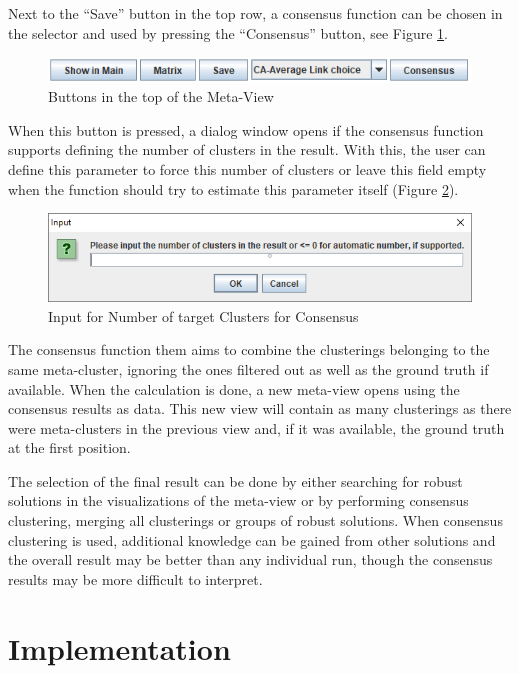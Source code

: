 \documentclass[
	a4paper,
	english,
	twoside,
	openright,               
	11pt                            
	]{report}
\begin{document}
Next to the ``Save'' button in the top row, a consensus function can be chosen in the selector and used by pressing the ``Consensus'' button, see Figure \ref{fig:cons_button}. 

\begin{figure}[h]
	\centering
	\includegraphics[scale=.75]{cons_button}
	\caption{Buttons in the top of the Meta-View}
	\label{fig:cons_button}
\end{figure}

When this button is pressed, a dialog window opens if the consensus function supports defining the number of clusters in the result. With this, the user can define this parameter to force this number of clusters or leave this field empty when the function should try to estimate this parameter itself (Figure \ref{fig:choosek_window}).

\begin{figure}[h]
	\centering
	\includegraphics[scale=.6]{choosek_window}
	\caption{Input for Number of target Clusters for Consensus}
	\label{fig:choosek_window}
\end{figure}

The consensus function them aims to combine the clusterings belonging to the same meta-cluster, ignoring the ones filtered out as well as the ground truth if available. When the calculation is done, a new meta-view opens using the consensus results as data. This new view will contain as many clusterings as there were meta-clusters in the previous view and, if it was available, the ground truth at the first position.

The selection of the final result can be done by either searching for robust solutions in the visualizations of the meta-view or by performing consensus clustering, merging all clusterings or groups of robust solutions. When consensus clustering is used, additional knowledge can be gained from other solutions and the overall result may be better than any individual run, though the consensus results may be more difficult to interpret.

\chapter{Implementation}\label{cha:impl}
\end{document}
